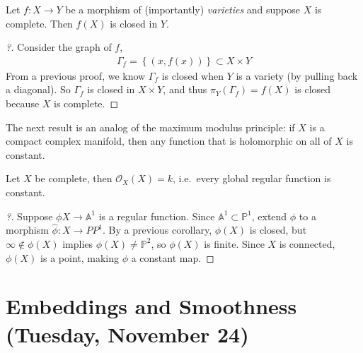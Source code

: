 \begin{corollary}

Let \(f:X\to Y\) be a morphism of (importantly) \emph{varieties} and
suppose \(X\) is complete. Then \(f(X)\) is closed in \(Y\).

\end{corollary}

\begin{proof}[?]

Consider the graph of \(f\),
\begin{align*}
\Gamma_f = \left\{{(x, f(x))}\right\} \subset X\times Y
\end{align*}
From a previous proof, we know \(\Gamma_f\) is closed when \(Y\) is a
variety (by pulling back a diagonal). So \(\Gamma_f\) is closed in
\(X\times Y\), and thus \(\pi_Y(\Gamma_f) = f(X)\) is closed because
\(X\) is complete.

\end{proof}

The next result is an analog of the maximum modulus principle: if \(X\)
is a compact complex manifold, then any function that is holomorphic on
all of \(X\) is constant.

\begin{corollary}

Let \(X\) be complete, then \({\mathcal{O}}_X(X) = k\), i.e.~every
global regular function is constant.

\end{corollary}

\begin{proof}[?]

Suppose \(\phi X\to {\mathbb{A}}^1\) is a regular function. Since
\({\mathbb{A}}^1 \subset {\mathbb{P}}^1\), extend \(\phi\) to a morphism
\(\widehat{\phi}: X\to PP^1\). By a previous corollary, \(\phi(X)\) is
closed, but \(\infty \not\in \phi(X)\) implies
\(\phi(X) \neq {\mathbb{P}}^2\), so \(\phi(X)\) is finite. Since \(X\)
is connected, \(\phi(X)\) is a point, making \(\phi\) a constant map.

\end{proof}

\hypertarget{embeddings-and-smoothness-tuesday-november-24}{%
\section{Embeddings and Smoothness (Tuesday, November
24)}\label{embeddings-and-smoothness-tuesday-november-24}}

